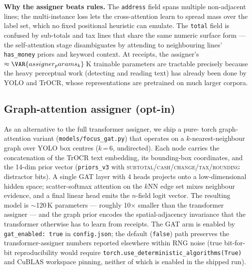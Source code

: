 \textbf{Why the assigner beats rules.}
The \texttt{address} field spans multiple non-adjacent lines; the
multi-instance loss lets the cross-attention learn to spread mass
over the label set, which no fixed positional heuristic can emulate.
The \texttt{total} field is confused by sub-totals and tax lines that
share the same numeric surface form --- the self-attention stage
disambiguates by attending to neighbouring lines' \texttt{has\_money}
priors and keyword context.  At  receipts, the assigner's
$\approx\VAR{assigner_params_k}$\,K trainable parameters are
tractable precisely because the heavy perceptual work (detecting and
reading text) has already been done by YOLO and TrOCR, whose
representations are pretrained on much larger corpora.

\subsection{Graph-attention assigner (opt-in)}\label{sec:gat}

As an alternative to the full transformer assigner, we ship a pure-
torch graph-attention variant (\texttt{models/focus\_gat.py}) that
operates on a $k$-nearest-neighbour graph over YOLO box centres
($k$\,=\,6, undirected).  Each node carries the concatenation of
the TrOCR text embedding, its bounding-box coordinates, and the
14-dim prior vector (\texttt{priors\_v3} with
\textsc{subtotal}/\textsc{cash}/\textsc{change}/\textsc{tax}/\textsc{rounding}
distractor bits).  A single GAT layer with 4 heads projects onto
a low-dimensional hidden space; scatter-softmax attention on the $k$NN edge
set mixes neighbour evidence, and a final linear head emits the
$n$-field logit vector.  The resulting model is $\sim$120\,K
parameters --- roughly 10$\times$ smaller than the transformer
assigner --- and the graph prior encodes the spatial-adjacency
invariance that the transformer otherwise has to learn from
 receipts.  The GAT arm is enabled by \texttt{gat\_enabled: true} in
\texttt{config.json}; the default (\texttt{false}) path preserves
the transformer-assigner numbers reported elsewhere within RNG noise
(true bit-for-bit reproducibility would require
\texttt{torch.use\_deterministic\_algorithms(True)} and CuBLAS
workspace pinning, neither of which is enabled in the shipped run).

